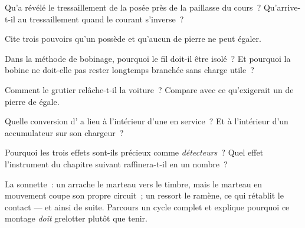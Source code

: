 \begin{exercise}[$\star$]\label{exo:g8:electric-current-effects:3}
Qu'a révélé le tressaillement de la  posée près de la
paillasse du cours~? Qu'arrive-t-il au tressaillement quand le
courant s'inverse~?
\end{exercise}

\begin{exercise}[$\star$]\label{exo:g8:electric-current-effects:4}
Cite trois pouvoirs qu'un  possède et qu'aucun  de
pierre ne peut égaler.
\end{exercise}

\begin{exercise}[$\star$]\label{exo:g8:electric-current-effects:5}
Dans la méthode de bobinage, pourquoi le fil doit-il être isolé~? Et
pourquoi la bobine ne doit-elle pas rester longtemps branchée sans
charge utile~?
\end{exercise}

\begin{exercise}[$\star$]\label{exo:g8:electric-current-effects:6}
Comment le grutier relâche-t-il la voiture~? Compare avec ce
qu'exigerait un  de pierre de  égale.
\end{exercise}

\begin{exercise}[$\star$]\label{exo:g8:electric-current-effects:7}
Quelle conversion d' a lieu à l'intérieur d'une  en
service~? Et à l'intérieur d'un accumulateur sur son chargeur~?
\end{exercise}

\begin{exercise}[$\star$]\label{exo:g8:electric-current-effects:8}
Pourquoi les trois effets sont-ils précieux comme
\emph{détecteurs}~? Quel effet l'instrument du chapitre suivant
raffinera-t-il en un nombre~?
\end{exercise}

\begin{exercise}[$\star\star$]\label{exo:g8:electric-current-effects:9}
La sonnette~: un  arrache le marteau vers le timbre,
mais le marteau en mouvement coupe son propre circuit~; un ressort le
ramène, ce qui rétablit le contact --- et ainsi de suite. Parcours un
cycle complet et explique pourquoi ce montage \emph{doit} grelotter
plutôt que tenir.
\end{exercise}


